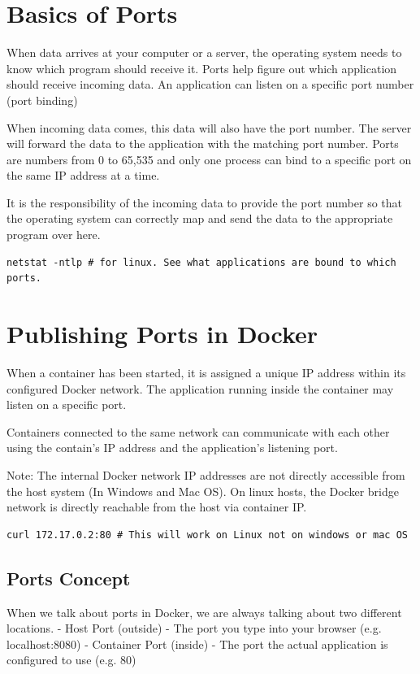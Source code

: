 \documentclass[11pt]{book}
\begin{document}
    \section{Basics of Ports}
    When data arrives at your computer or a server, the operating system needs to know which program should receive it.
    Ports help figure out which application should receive incoming data.
    An application can listen on a specific port number (port binding)

    When incoming data comes, this data will also have the port number.
    The server will forward the data to the application with the matching port number.
    Ports are numbers from 0 to 65,535 and only one process can bind to a specific port on the same IP address at a time.

    It is the responsibility of the incoming data to provide the port number so that the operating system can correctly map and send the data to the appropriate program over here.


    \begin{lstlisting}[style=terminal]
        netstat -ntlp # for linux. See what applications are bound to which ports.
    \end{lstlisting}


    \section{Publishing Ports in Docker}
    When a container has been started, it is assigned a unique IP address within its configured Docker network.
    The application running inside the container may listen on a specific port.

    Containers connected to the same network can communicate with each other using the contain's IP address and the application's listening port.

    Note: The internal Docker network IP addresses are not directly accessible from the host system (In Windows and Mac OS).
    On linux hosts, the Docker bridge network is directly reachable from the host via container IP.

    \begin{lstlisting}[style=terminal]
        curl 172.17.0.2:80 # This will work on Linux not on windows or mac OS
    \end{lstlisting}

    \subsection{Ports Concept}
    When we talk about ports in Docker, we are always talking about two different locations.
    - Host Port (outside) - The port you type into your browser (e.g. localhost:8080)
    - Container Port (inside) - The port the actual application is configured to use (e.g. 80)
\end{document}
